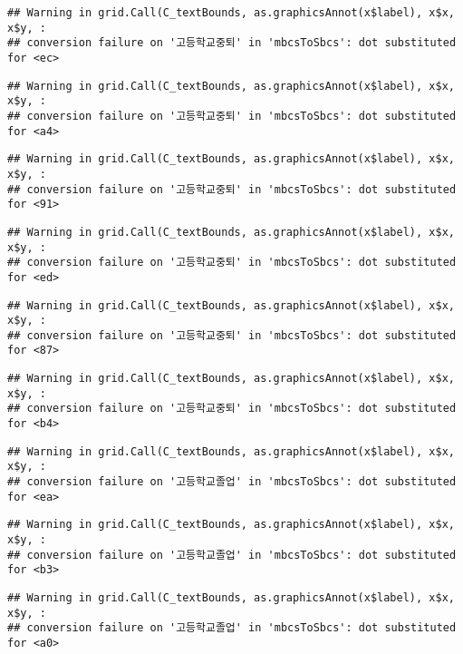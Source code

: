 \documentclass[
]{article}
\begin{document}
\begin{verbatim}
## Warning in grid.Call(C_textBounds, as.graphicsAnnot(x$label), x$x, x$y, :
## conversion failure on '고등학교중퇴' in 'mbcsToSbcs': dot substituted for <ec>
\end{verbatim}

\begin{verbatim}
## Warning in grid.Call(C_textBounds, as.graphicsAnnot(x$label), x$x, x$y, :
## conversion failure on '고등학교중퇴' in 'mbcsToSbcs': dot substituted for <a4>
\end{verbatim}

\begin{verbatim}
## Warning in grid.Call(C_textBounds, as.graphicsAnnot(x$label), x$x, x$y, :
## conversion failure on '고등학교중퇴' in 'mbcsToSbcs': dot substituted for <91>
\end{verbatim}

\begin{verbatim}
## Warning in grid.Call(C_textBounds, as.graphicsAnnot(x$label), x$x, x$y, :
## conversion failure on '고등학교중퇴' in 'mbcsToSbcs': dot substituted for <ed>
\end{verbatim}

\begin{verbatim}
## Warning in grid.Call(C_textBounds, as.graphicsAnnot(x$label), x$x, x$y, :
## conversion failure on '고등학교중퇴' in 'mbcsToSbcs': dot substituted for <87>
\end{verbatim}

\begin{verbatim}
## Warning in grid.Call(C_textBounds, as.graphicsAnnot(x$label), x$x, x$y, :
## conversion failure on '고등학교중퇴' in 'mbcsToSbcs': dot substituted for <b4>
\end{verbatim}

\begin{verbatim}
## Warning in grid.Call(C_textBounds, as.graphicsAnnot(x$label), x$x, x$y, :
## conversion failure on '고등학교졸업' in 'mbcsToSbcs': dot substituted for <ea>
\end{verbatim}

\begin{verbatim}
## Warning in grid.Call(C_textBounds, as.graphicsAnnot(x$label), x$x, x$y, :
## conversion failure on '고등학교졸업' in 'mbcsToSbcs': dot substituted for <b3>
\end{verbatim}

\begin{verbatim}
## Warning in grid.Call(C_textBounds, as.graphicsAnnot(x$label), x$x, x$y, :
## conversion failure on '고등학교졸업' in 'mbcsToSbcs': dot substituted for <a0>
\end{verbatim}
\end{document}
